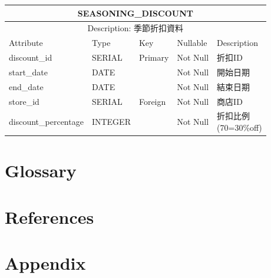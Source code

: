 \documentclass[a4paper, 12pt]{article}
\begin{document}
\noindent\begin{tabular}{ | p{7em} | p{5.5em} | p{5.5em} | p{4.5em} | p{11em} |}
  \hline
  \multicolumn{5}{|c|}{SEASONING_DISCOUNT} \tabularnewline
  \hline 
  \multicolumn{5}{|c|}{Description: 季節折扣資料} \tabularnewline
  \hline 
  Attribute & Type & Key & Nullable & Description \\
  \hline
  discount_id & SERIAL & Primary & Not Null & 折扣ID \\
  \hline
  start_date & DATE &  & Not Null & 開始日期 \\
  \hline
  end_date & DATE & &Not Null &結束日期\\
  \hline
  store_id& SERIAL & Foreign &Not Null &商店ID\\
  \hline
  discount_percentage & INTEGER &  &Not Null &\makecell[l]{折扣比例\\(70=30\%off)}\\
  \hline
\end{tabular}
\newpage
\section{Glossary}
\newpage

\section{References}
\printbibliography[heading=none]
\newpage

\section{Appendix}
\newpage
\end{document}
